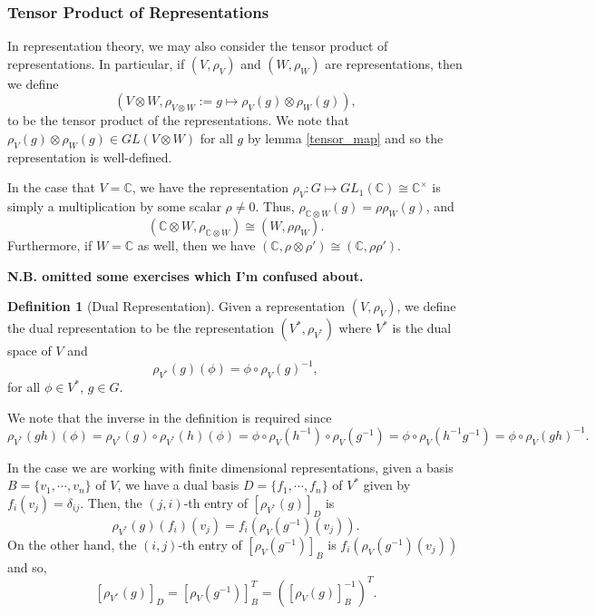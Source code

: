 \documentclass[]{article}
\theoremstyle{definition}
\theoremstyle{definition}
\newtheorem{definition}{Definition}[section]
\begin{document}
\subsubsection{Tensor Product of Representations}

In representation theory, we may also consider the tensor product of 
representations. In particular, if \((V, \rho_V)\) and \((W, \rho_W)\) are 
representations, then we define 
\[(V \otimes W, \rho_{V \otimes W} := g \mapsto \rho_V(g) \otimes \rho_W(g)),\]
to be the tensor product of the representations. We note that 
\(\rho_V(g) \otimes \rho_W(g) \in GL(V \otimes W)\) for all 
\(g\) by lemma \ref{tensor_map} and so the representation is well-defined. 

In the case that \(V = \mathbb{C}\), we have the representation 
\(\rho_V : G \mapsto GL_1(\mathbb{C}) \cong \mathbb{C}^\times\) is simply a 
multiplication by some scalar \(\rho \neq 0\). Thus, 
\(\rho_{\mathbb{C} \otimes W}(g) = \rho \rho_W(g)\), and 
\[(\mathbb{C} \otimes W, \rho_{\mathbb{C} \otimes W}) \cong (W, \rho \rho_W).\]
Furthermore, if \(W = \mathbb{C}\) as well, then we have 
\((\mathbb{C}, \rho \otimes \rho') \cong (\mathbb{C}, \rho\rho')\).  

\textbf{N.B. omitted some exercises which I'm confused about.}

\begin{definition}[Dual Representation]
  Given a representation \((V, \rho_V)\), we define the dual representation 
  to be the representation \((V^*, \rho_{V^*})\) where \(V^*\) is the dual space 
  of \(V\) and 
  \[\rho_{V^*}(g)(\phi) = \phi \circ \rho_V(g)^{-1},\]
  for all \(\phi \in V^*\), \(g \in G\).
\end{definition}

We note that the inverse in the definition is required since 
\[\rho_{V^*}(gh)(\phi) = \rho_{V^*}(g) \circ \rho_{V^*}(h)(\phi) = 
  \phi \circ \rho_V(h^{-1}) \circ \rho_V(g^{-1}) = 
  \phi \circ \rho_V(h^{-1}g^{-1}) = \phi \circ \rho_V(gh)^{-1}.\]

In the case we are working with finite dimensional representations, given a 
basis \(B = \{v_1, \cdots, v_n\}\) of \(V\), we have a 
dual basis \(D = \{f_1, \cdots, f_n\}\) of \(V^*\) given by 
\(f_i(v_j) = \delta_{ij}\). Then, the \((j, i)\)-th entry of 
\([\rho_{V^*}(g)]_D\) is 
\[\rho_{V^*}(g)(f_i)(v_j) = f_i(\rho_V(g^{-1})(v_j)).\]
On the other hand, the \((i, j)\)-th entry of \([\rho_V(g^{-1})]_B\) is 
\(f_i(\rho_V(g^{-1})(v_j))\) and so, 
\[[\rho_{V^*}(g)]_D = [\rho_V(g^{-1})]_B^T =  ([\rho_V(g)]_B^{-1})^T.\]
\end{document}
